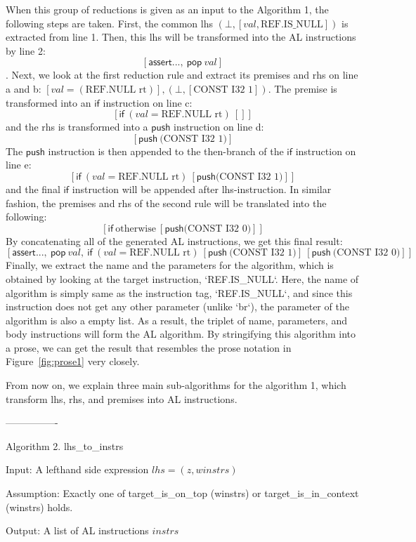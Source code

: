When this group of reductions is given as an input to the Algorithm 1, the following steps are taken.
First, the common lhs $(\bot, [val, \text{REF.IS\_NULL}])$ is extracted from line 1.
Then, this lhs will be transformed into the AL instructions by line 2:
\[[\mathsf{assert} ...,~\mathsf{pop}~val]\].
Next, we look at the first reduction rule and extract its premises and rhs on line a and b:
$ [val = (\text{REF.NULL rt})], (\bot, [\text{CONST I32 1}])$.
The premise is transformed into an $\mathsf{if}$ instruction on line c:
\[[\mathsf{if}~(val = \text{REF.NULL rt})~[]]\]
and the rhs is transformed into a $\mathsf{push}$ instruction on line d:
\[[\mathsf{push}~\text{(CONST I32 1)}]\]
The $\mathsf{push}$ instruction is then appended to the then-branch of the $\mathsf{if}$ instruction on line e:
\[[\mathsf{if}~(val = \text{REF.NULL rt})~[\mathsf{push} \text{(CONST I32 1)}]]\]
and the final $\mathsf{if}$ instruction will be appended after lhs-instruction.
In similar fashion, the premises and rhs of the second rule will be translated into the following:
\[[\mathsf{if}~\text{otherwise}~[\mathsf{push} \text{(CONST I32 0)}]]\]
By concatenating all of the generated AL instructions, we get this final result:
\[[
\mathsf{assert} ...,~
\mathsf{pop}~val,~
\mathsf{if}~(val = \text{REF.NULL rt})~[\mathsf{push}~\text{(CONST I32 1)}]~[\mathsf{push}~\text{(CONST I32 0)}]
]\]
Finally, we extract the name and the parameters for the algorithm, which is obtained by looking at
the target instruction, `REF.IS\_NULL`. Here, the name of algorithm is simply same as the instruction tag,
`REF.IS\_NULL`, and since this instruction does not get any other parameter (unlike `br`), the parameter of
the algorithm is also a empty list. As a result, the triplet of name, parameters, and body instructions will form
the AL algorithm.
By stringifying this algorithm into a prose, we can get the result that resembles the prose notation in
Figure~\ref{fig:prose1} very closely.

From now on, we explain three main sub-algorithms for the algorithm 1,
which transform lhs, rhs, and premises into AL instructions.

----------------

Algorithm 2. lhs\_to\_instrs

Input: A lefthand side expression $lhs = (z, winstrs)$

Assumption: Exactly one of target\_is\_on\_top (winstrs) or target\_is\_in\_context (winstrs) holds.

Output: A list of AL instructions $instrs$

